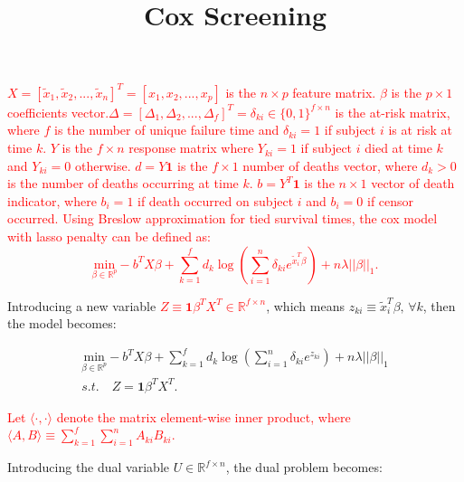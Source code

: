 \documentclass{article}
\title{Cox Screening}
\date{}
\providecommand{\note}[1]{\textcolor{red}{#1}}
\begin{document}
\maketitle
\note{
$X=[\tilde{x}_1,\tilde{x}_2,...,\tilde{x}_n]^T=[x_1,x_2,...,x_p]$ is the $n\times p$ feature matrix. $\beta$ is the $p\times 1$ coefficients vector.$\Delta=[\Delta_1,\Delta_2,...,\Delta_f]^T=\delta_{ki}\in\{0,1\}^{f\times n}$ is the at-risk matrix, where $f$ is the number of unique failure time and $\delta_{ki}=1$ if subject $i$ is at risk at time $k$. $Y$ is the $f\times n$ response matrix where $Y_{ki}=1$ if subject $i$ died at time $k$ and $Y_{ki}=0$ otherwise. $d=Y\mathbf{1}$ is the $f\times 1$ number of deaths vector, where $d_k>0$ is the number of deaths occurring at time $k$. $b=Y^T\mathbf{1}$ is the $n\times1$ vector of death indicator, where $b_i=1$ if death occurred on subject $i$ and $b_i=0$ if censor occurred. Using Breslow approximation for tied survival times, the cox model with lasso penalty can be defined as:
\begin{equation}
    \label{eq:cox}
    \underset{\beta\in \mathbb{R}^p}{\mathrm{min}}-b^TX\beta+\sum_{k=1}^f d_k\log\left(\sum_{i=1}^n \delta_{ki} e^{\tilde{x}_i^T\beta}\right)+n\lambda||\beta||_1.
\end{equation}
}

Introducing a new variable \note{$Z\equiv\mathbf{1}\beta^TX^T\in\mathbb{R}^{f\times n}$}, which means $z_{ki}\equiv\tilde{x}_i^T\beta,\,\forall k$, then the model becomes:

\begin{equation}
    \label{eq:dual+z}
    \begin{gathered}
    \underset{\beta\in \mathbb{R}^p}{\mathrm{min}}-b^TX\beta+\sum_{k=1}^f d_k\log\left(\sum_{i=1}^n \delta_{ki} e^{z_{ki}}\right)+n\lambda||\beta||_1\\s.t.\quad Z=\mathbf{1}\beta^TX^T.
\end{gathered}
\end{equation}

\note{Let $\langle\cdot,\cdot\rangle$ denote the matrix element-wise inner product, where $\langle A,B \rangle\equiv\sum_{k=1}^f\sum_{i=1}^nA_{ki}B_{ki}$.}

Introducing the dual variable $U\in\mathbb{R}^{f\times n}$, the dual problem becomes:
\end{document}
